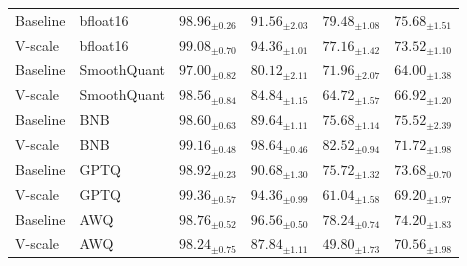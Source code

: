 \documentclass{article}
\theoremstyle{plain}
\theoremstyle{definition}
\theoremstyle{remark}
\begin{document}
\begin{table}[ht]
\begin{tabular}{llcccc}
        Baseline & bfloat16 & $98.96_{\pm 0.26}$ & $91.56_{\pm 2.03}$ & $\mathbf{79.48}_{\pm 1.08}$ & $\mathbf{75.68}_{\pm 1.51}$ \\
        V-scale & bfloat16 & $\mathbf{99.08}_{\pm 0.70}$ & $\mathbf{94.36}_{\pm 1.01}$ & $77.16_{\pm 1.42}$ & $73.52_{\pm 1.10}$ \\
        Baseline & SmoothQuant & $97.00_{\pm 0.82}$ & $80.12_{\pm 2.11}$ & $\mathbf{71.96}_{\pm 2.07}$ & $64.00_{\pm 1.38}$ \\
        V-scale & SmoothQuant & $\mathbf{98.56}_{\pm 0.84}$ & $\mathbf{84.84}_{\pm 1.15}$ & $64.72_{\pm 1.57}$ & $\mathbf{66.92}_{\pm 1.20}$ \\
        Baseline & BNB & $98.60_{\pm 0.63}$ & $89.64_{\pm 1.11}$ & $75.68_{\pm 1.14}$ & $\mathbf{75.52}_{\pm 2.39}$ \\
        V-scale & BNB & $\mathbf{99.16}_{\pm 0.48}$ & $\mathbf{98.64}_{\pm 0.46}$ & $\mathbf{82.52}_{\pm 0.94}$ & $71.72_{\pm 1.98}$ \\
        Baseline & GPTQ & $98.92_{\pm 0.23}$ & $90.68_{\pm 1.30}$ & $\mathbf{75.72}_{\pm 1.32}$ & $\mathbf{73.68}_{\pm 0.70}$ \\
        V-scale & GPTQ & $\mathbf{99.36}_{\pm 0.57}$ & $\mathbf{94.36}_{\pm 0.99}$ & $61.04_{\pm 1.58}$ & $69.20_{\pm 1.97}$ \\
        Baseline & AWQ & $\mathbf{98.76}_{\pm 0.52}$ & $\mathbf{96.56}_{\pm 0.50}$ & $\mathbf{78.24}_{\pm 0.74}$ & $\mathbf{74.20}_{\pm 1.83}$ \\
        V-scale & AWQ & $98.24_{\pm 0.75}$ & $87.84_{\pm 1.11}$ & $49.80_{\pm 1.73}$ & $70.56_{\pm 1.98}$ \\
        \bottomrule
    \end{tabular}
\end{table}
\end{document}
